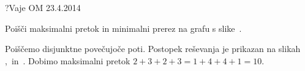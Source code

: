 \begin{naloga}{?}{Vaje OM 23.4.2014}
\begin{vprasanje}
Poišči maksimalni pretok in minimalni prerez na grafu s slike~\fig.

\begin{slika}
\pgfslika
{}
\end{slika}
\end{vprasanje}

\begin{odgovor}
Poiščemo disjunktne povečujoče poti.
Postopek reševanja je prikazan na slikah~%
\fig[pretok2a],~\fig[pretok2b] in~\fig[pretok2c].
Dobimo maksimalni pretok $2+3+2+3 = 1+4+4+1 = 10$.

\begin{slika}
\pgfslika[pretok2a]
\end{slika}
\begin{slika}
\pgfslika[pretok2b]
\end{slika}
\begin{slika}
\pgfslika[pretok2c]
\end{slika}
\end{odgovor}
\end{naloga}
